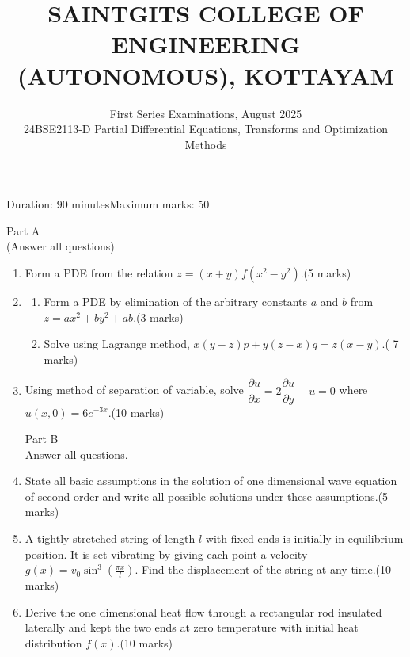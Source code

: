 \documentclass[]{article}
\title{\Large SAINTGITS COLLEGE OF ENGINEERING (AUTONOMOUS), KOTTAYAM}
\author{First Series Examinations, August 2025\\ 24BSE2113-D Partial Differential Equations, Transforms and Optimization Methods}
\date{}
\begin{document}
\maketitle
Duration: 90 minutes\hfill Maximum marks: 50
\begin{center}
	Part A\\
	(Answer all questions)
\end{center}
\begin{enumerate}
	\item Form a PDE from the relation $z=(x+y)f(x^2-y^2).$\hfill (5 marks)
	\item 
	\begin{enumerate}
		\item  Form a PDE by elimination of the arbitrary constants $a$ and $b$ from $z=ax^2+by^2+ab$.\hfill(3 marks)
		\item Solve using Lagrange method, $x(y-z)p+y(z-x)q=z(x-y)$.\hfill( 7 marks)
	\end{enumerate}
	\item Using method of separation of variable, solve $\displaystyle \dfrac{\partial u}{\partial x}=2\dfrac{\partial u}{\partial y}+u=0$ where $u(x,0)=6e^{-3x}$.\hfill(10 marks)
	\begin{center}
		Part B\\
		Answer all questions.
	\end{center}
\item State all basic assumptions in the solution of one dimensional wave equation of second order and write all possible solutions under these assumptions.\hfill(5 marks)
\item A tightly stretched string of length $l$ with fixed ends is initially in equilibrium position. It is set vibrating by giving each point a velocity $g(x)=v_0\sin^3\left(\frac{\pi x}{l}\right)$. Find the displacement of the string at any time.\hfill(10 marks)
\item Derive the one dimensional heat flow through a rectangular rod insulated laterally and kept the two ends at zero temperature with initial heat distribution $f(x)$.\hfill(10 marks)
\end{enumerate}
\end{document}
